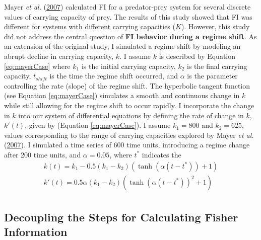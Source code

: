 \documentclass[12pt,twoside,openany]{reedthesis}
\begin{document}
Mayer \emph{et al.} (\protect\hyperlink{ref-mayer_applications_2007}{2007}) calculated FI for a predator-prey system for several discrete values of carrying capacity of prey. The results of this study showed that FI was different for systems with different carrying capacities (\(K\)). However, this study did not address the central question of \textbf{FI behavior during a regime shift}. As an extension of the original study, I simulated a regime shift by modeling an abrupt decline in carrying capacity, \(k\). I assume \(k\) is described by Equation \eqref{eq:mayerCase} where \(k_1\) is the initial carrying capacity, \(k_2\) is the final carrying capacity, \(t_{shift}\) is the time the regime shift occurred, and \(\alpha\) is the parameter controlling the rate (slope) of the regime shift. The hyperbolic tangent function (see Equation \eqref{eq:mayerCase}) simulates a smooth and continuous change in \(k\) while still allowing for the regime shift to occur rapidly. I incorporate the change in \(k\) into our system of differential equations by defining the rate of change in \(k\), \(k'(t)\), given by (Equation \eqref{eq:mayerCase}). I assume \(k_1=800\) and \(k_2=625\), values corresponding to the range of carrying capacities explored by Mayer \emph{et al.} (\protect\hyperlink{ref-mayer_applications_2007}{2007}). I simulated a time series of 600 time units, introducing a regime change after 200 time units, and \(\alpha=0.05\), where \(t^*\) indicates the
\begin{equation}  
\begin{array}{rcr}
  k(t) = k_1  - 0.5(k_1-k_2)(\tanh(\alpha (t-t^*))+1) \\ 
  k'(t) = 0.5\alpha (k_1-k_2)(\tanh(\alpha(t-t^*))^2 +1) \\
\label{eq:mayerCase}
\end{array}
\end{equation}
\hypertarget{decoupling-the-steps-for-calculating-fisher-information}{%
\subsection{Decoupling the Steps for Calculating Fisher Information}\label{decoupling-the-steps-for-calculating-fisher-information}}
\end{document}
